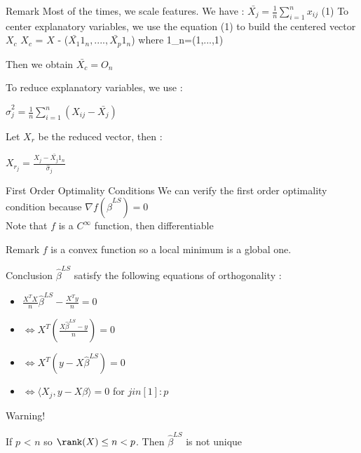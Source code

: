 \documentclass[unknownkeysallowed]{beamer}
\begin{document}
\begin{block}{Remark}
Most of the times, we scale features.
\newline
We have : $\bar{X_{j}}=\frac{1}{n} \sum\limits_{i=1}^{n} x_{ij}$ (1)
\newline
 To center explanatory variables, we use the equation (1) to build the centered vector $X_{c}$
\newline
$X_{c}$ =  $X$ - ($\bar{X_{1}}1_n,....,\bar{X_{p}}1_n$) where 1_n=(1,...,1)

Then we obtain $\bar{X_{c}}=O_n$ 

To reduce explanatory variables, we use :
\newline
\begin{center}
$\hat\sigma_{j}^2=\frac{1}{n} \sum\limits_{i=1}^{n} (X_{ij}-\bar{X_{j}})$   
\end{center}
Let $X_r$ be the reduced vector, then :
\newline
\begin{center}
$X_{r_{j}}=\frac{X_{j}-\bar{X_{j}}1_n}{\hat\sigma_{j}}$    
\end{center}

\end{block}


\begin{frame}
\begin{alertblock}{First Order Optimality Conditions}
We can verify the first order optimality condition because $\nabla{f(\hat\beta^{LS})}=0$
\\
Note that $f$ is a $C^{\infty}$ function, then differentiable

\end{alertblock}
 
\begin{block}{Remark}
\rem $f$ is a convex function so a local minimum is a global one. 
\end{block}
 
\begin{block}{Conclusion}
$\hat\beta^{LS}$ satisfy the following equations of orthogonality :
\begin{itemize}
        \item $\frac{X^TX}{n}\hat\beta^{LS}-\frac{X^Ty}{n}=0$
        \item $\iff X^T(\frac{X\hat\beta^{LS}-y}{n})=0$
        \item $\iff X^T(y-X\hat\beta^{LS})=0$
        \item $\iff \langle X_{j},y-X\beta\rangle=0$ for $j in [1]:p$
    \end{itemize}


\end{block}

\newpage

\begin{block}{Warning!}

If $p$ < $n$ so $\rank(X) \leq n < p$. Then $\hat\beta^{LS}$ is not unique 

\end{block}

    
\end{frame}
\end{document}
